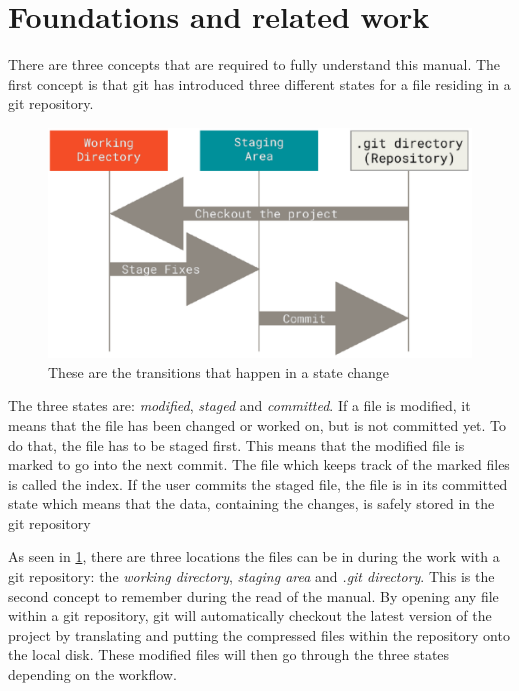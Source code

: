 \section{Foundations and related work}
There are three concepts that are required to fully understand this manual. The first concept is that git has introduced three different states for a file residing in a git repository.
\begin{figure} [H]
    \centering
    \includegraphics[width=\textwidth]{git_manual/figures/three_states.pdf}
    \caption{These are the transitions that happen in a state change\cite{CS20}}
    \label{fig:three_states}
\end{figure}
The three states are: \textit{modified}, \textit{staged} and \textit{committed}. If a file is modified, it means that the file has been changed or worked on, but is not committed yet.
To do that, the file has to be staged first. This means that the modified file is marked to go into the next commit. The file which keeps track of the marked files is called the \dq{}index\dq{}. If the user commits the staged file, the file is in its committed state which means that the data, containing the changes, is safely stored in the git repository

As seen in \ref{fig:three_states}, there are three locations the files can be in during the work with a git repository: the \textit{working directory}, \textit{staging area} and \textit{.git directory}. This is the second concept to remember during the read of the manual.
By opening any file within a git repository, git will automatically checkout the latest version of the project by translating and putting the compressed files within the repository onto the local disk. These modified files will then go through the three states depending on the workflow.

